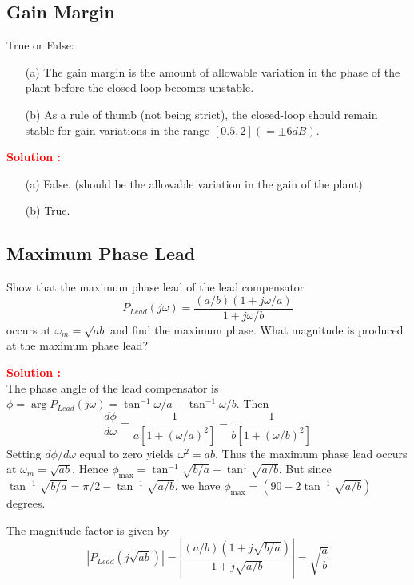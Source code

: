 \documentclass[12pt]{article}
\begin{document}
\clearpage
\subsection{Gain Margin}

True or False:
\begin{itemize}
    \item[(a)] The gain margin is the amount of allowable variation in the phase of the plant before the closed loop becomes unstable.
    \item[(b)] As a rule of thumb (not being strict), the closed-loop should remain stable for gain variations in the range $[0.5, 2] (= ±6dB)$. 
    \end{itemize}
\textbf{\textcolor{red}{Solution :}} \\
\begin{itemize}
    \item[(a)] False. (should be the allowable variation in the gain of the plant) 
    \item[(b)] True. 
\end{itemize}

\clearpage
\subsection{Maximum Phase Lead}

Show that the maximum phase lead of the lead compensator
\begin{equation}
    P_{Lead}(j\omega) = \frac{(a/b)(1+j\omega/a)}{1+j\omega/b}
\end{equation}
occurs at \(\omega_m = \sqrt{ab}\) and find the maximum phase. What magnitude is produced at the maximum phase lead?

\textbf{\textcolor{red}{Solution :}} \\
The phase angle of the lead compensator is \(\phi = \arg P_{Lead}(j\omega) = \tan^{-1} \omega/a - \tan^{-1} \omega/b\). Then
\begin{equation}
    \frac{d\phi}{d\omega} = \frac{1}{a[1+(\omega/a)^2]} - \frac{1}{b[1+(\omega/b)^2]}
\end{equation}
Setting \(d\phi/d\omega\) equal to zero yields \(\omega^2 = ab\). Thus the maximum phase lead occurs at \(\omega_m = \sqrt{ab}\). Hence \(\phi_{\max} = \tan^{-1}\sqrt{b/a}-\tan^{1}\sqrt{a/b}\). But since \(\tan^{-1}\sqrt{b/a} = \pi/2-\tan^{-1}\sqrt{a/b}\), we have \(\phi_{\max} = (90 - 2\tan^{-1}\sqrt{a/b})\) degrees.

The magnitude factor is given by
\[|P_{Lead}(j\sqrt{ab})| = |\frac{(a/b)(1+j\sqrt{b/a})}{1+j\sqrt{a/b}}| = \sqrt{\frac{a}{b}}\]
\end{document}
